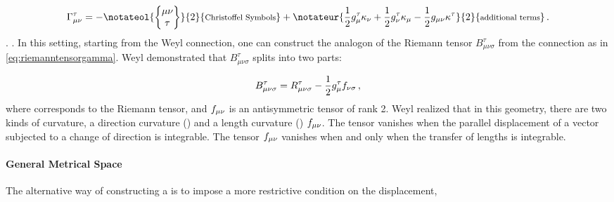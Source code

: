 \documentclass[final]{article}
\newcommand{\faradaymn}{\ensuremath{f\mn}}
\newcommand{\faraday}{\ensuremath{f}}
\begin{document}
\begin{equation}\label{eq:weylconnection}
\Gtmn=-\notateol{\christoffel{\mu}{\nu}{\tau}}{2}{\texts{Christoffel Symbols}}+\notateur{\frac{1}{2} g_{\mu}^{\tau} \kappa_{\nu}+\frac{1}{2} g_{\nu}^{\tau} \kappa_{\mu}-\frac{1}{2} \gmn \kappa^{\tau}}{2}{\texts{additional terms}} \,.
\end{equation}
%
. . In this setting, starting from the Weyl connection, one can construct the analogon of the Riemann tensor  $B_{\mu \nu \sigma}^{\tau}$ from the connection as in \cref{eq:riemanntensorgamma}. %
% 
%
Weyl demonstrated that $B_{\mu \nu \sigma}^{\tau}$ splits into two parts:

\begin{equation*}
B_{\mu \nu \sigma}^{\tau} = \rite - \frac{1}{2} g^\tau_\mu \faraday_{\nu\sigma}\,,
\end{equation*}
%
where \rite corresponds to the Riemann tensor, and $\faradaymn$ is an antisymmetric tensor of rank 2. Weyl realized that in this geometry, there are two kinds of curvature, a direction curvature () \rite and a length curvature () $\faradaymn$. The tensor \rite vanishes when the parallel displacement of a vector subjected to a change of direction is integrable. The tensor $\faradaymn$ vanishes when and only when the transfer of lengths is integrable.


\paragraph{General Metrical Space} The alternative way of constructing a  is to impose a more restrictive condition on the displacement,
\end{document}
